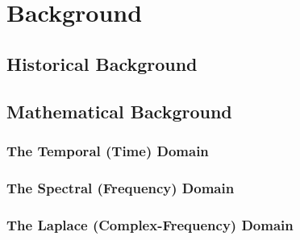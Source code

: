 \documentclass[american, twoside]{article}
\begin{document}
\section{Background} \label{Background}
\subsection{Historical Background} \label{Background:History}

\subsection{Mathematical Background} \label{Background:Math}

\subsubsection{The Temporal (Time) Domain} \label{Background:Math:Temporal}

\subsubsection{The Spectral (Frequency) Domain} \label{Background:Math:Spectral}

\subsubsection{The Laplace (Complex-Frequency) Domain} \label{Background:Math:Laplace}

\end{document}
